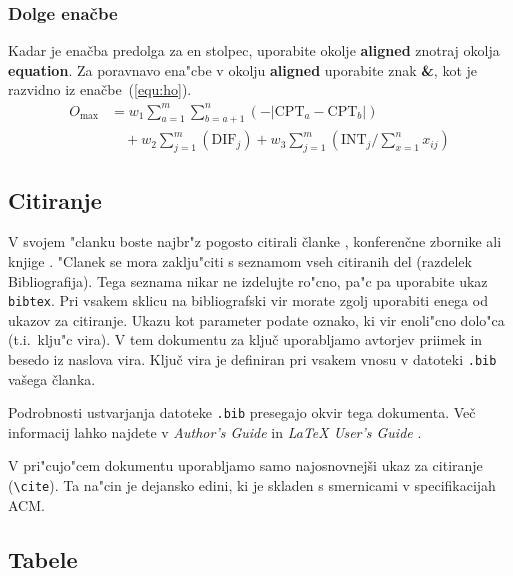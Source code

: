 \documentclass[sigconf,nonacm]{acmart}
\begin{document}
\subsubsection{Dolge enačbe}

Kadar je enačba predolga za en stolpec, uporabite okolje \textbf{aligned}
znotraj okolja \textbf{equation}.  Za poravnavo ena"cbe v okolju
\textbf{aligned} uporabite znak \textbf{\&}, kot je razvidno iz
enačbe~(\ref{equ:ho}).
%
\begin{equation}
    \begin{aligned}
        O_{\max}& = w_1 \sum_{a=1}^{m} \sum_{b=a+1}^{n} (-\lvert\text{CPT}_a 
        -\text{CPT}_b\rvert)\\ 
        &\quad + w_2 \sum_{j=1}^{m} (\text{DIF}_j) + w_3 \sum_{j=1}^{m} 
        (\text{INT}_j/\sum_{x=1}^{n} x_{ij})
    \end{aligned}
    \label{equ:ho}
\end{equation}

\subsection{Citiranje}

V svojem "clanku boste najbr"z pogosto citirali članke \cite{lecun2015deep,
braams:babel, herlihy:methodology}, konferenčne zbornike
\cite{vrbancic2019transfer, clark:pct} ali knjige \cite{salas:calculus,
Lamport:LaTeX, fister2019computational}.  "Clanek se mora zaklju"citi s
seznamom vseh citiranih del (razdelek Bibliografija).  Tega seznama nikar ne
izdelujte ro"cno, pa"c pa uporabite ukaz \texttt{bibtex}.  Pri vsakem sklicu
na bibliografski vir morate zgolj uporabiti enega od ukazov za citiranje.
Ukazu kot parameter podate oznako, ki vir enoli"cno dolo"ca (t.i.\ klju"c
vira).  V tem dokumentu za ključ uporabljamo avtorjev priimek in besedo iz
naslova vira.  Ključ vira je definiran pri vsakem vnosu v datoteki
\texttt{.bib} vašega članka.

Podrobnosti ustvarjanja datoteke \texttt{.bib} presegajo okvir tega dokumenta.
Več informacij lahko najdete v \emph{Author's Guide} in \emph{\LaTeX{} User's
Guide} \cite{Lamport:LaTeX}.

V pri"cujo"cem dokumentu uporabljamo samo najosnovnejši ukaz za citiranje
(\texttt{\textbackslash{}cite}).  Ta na"cin je dejansko edini, ki je skladen s
smernicami v specifikacijah ACM\@.

\subsection{Tabele}
\end{document}
